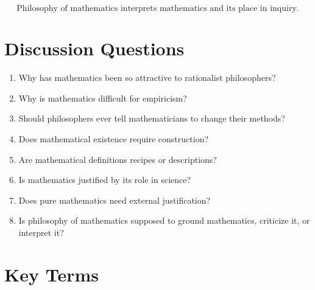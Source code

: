 \documentclass[11pt]{article}
\begin{document}
\[
\boxed{
\text{Philosophy of mathematics interprets mathematics and its place in inquiry.}
}
\]

\section*{Discussion Questions}

\begin{enumerate}[leftmargin=2em]
    \item Why has mathematics been so attractive to rationalist philosophers?
    \item Why is mathematics difficult for empiricism?
    \item Should philosophers ever tell mathematicians to change their methods?
    \item Does mathematical existence require construction?
    \item Are mathematical definitions recipes or descriptions?
    \item Is mathematics justified by its role in science?
    \item Does pure mathematics need external justification?
    \item Is philosophy of mathematics supposed to ground mathematics, criticize it, or interpret it?
\end{enumerate}

\section*{Key Terms}
\end{document}
